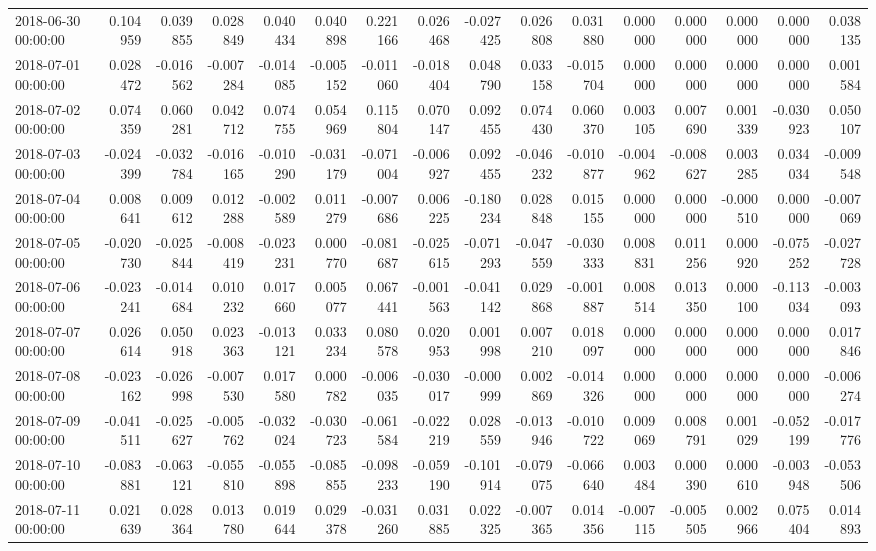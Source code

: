 \begin{tabular}{lrrrrrrrrrrrrrrr}
2018-06-30 00:00:00 & 0.104959 & 0.039855 & 0.028849 & 0.040434 & 0.040898 & 0.221166 & 0.026468 & -0.027425 & 0.026808 & 0.031880 & 0.000000 & 0.000000 & 0.000000 & 0.000000 & 0.038135 \\
2018-07-01 00:00:00 & 0.028472 & -0.016562 & -0.007284 & -0.014085 & -0.005152 & -0.011060 & -0.018404 & 0.048790 & 0.033158 & -0.015704 & 0.000000 & 0.000000 & 0.000000 & 0.000000 & 0.001584 \\
2018-07-02 00:00:00 & 0.074359 & 0.060281 & 0.042712 & 0.074755 & 0.054969 & 0.115804 & 0.070147 & 0.092455 & 0.074430 & 0.060370 & 0.003105 & 0.007690 & 0.001339 & -0.030923 & 0.050107 \\
2018-07-03 00:00:00 & -0.024399 & -0.032784 & -0.016165 & -0.010290 & -0.031179 & -0.071004 & -0.006927 & 0.092455 & -0.046232 & -0.010877 & -0.004962 & -0.008627 & 0.003285 & 0.034034 & -0.009548 \\
2018-07-04 00:00:00 & 0.008641 & 0.009612 & 0.012288 & -0.002589 & 0.011279 & -0.007686 & 0.006225 & -0.180234 & 0.028848 & 0.015155 & 0.000000 & 0.000000 & -0.000510 & 0.000000 & -0.007069 \\
2018-07-05 00:00:00 & -0.020730 & -0.025844 & -0.008419 & -0.023231 & 0.000770 & -0.081687 & -0.025615 & -0.071293 & -0.047559 & -0.030333 & 0.008831 & 0.011256 & 0.000920 & -0.075252 & -0.027728 \\
2018-07-06 00:00:00 & -0.023241 & -0.014684 & 0.010232 & 0.017660 & 0.005077 & 0.067441 & -0.001563 & -0.041142 & 0.029868 & -0.001887 & 0.008514 & 0.013350 & 0.000100 & -0.113034 & -0.003093 \\
2018-07-07 00:00:00 & 0.026614 & 0.050918 & 0.023363 & -0.013121 & 0.033234 & 0.080578 & 0.020953 & 0.001998 & 0.007210 & 0.018097 & 0.000000 & 0.000000 & 0.000000 & 0.000000 & 0.017846 \\
2018-07-08 00:00:00 & -0.023162 & -0.026998 & -0.007530 & 0.017580 & 0.000782 & -0.006035 & -0.030017 & -0.000999 & 0.002869 & -0.014326 & 0.000000 & 0.000000 & 0.000000 & 0.000000 & -0.006274 \\
2018-07-09 00:00:00 & -0.041511 & -0.025627 & -0.005762 & -0.032024 & -0.030723 & -0.061584 & -0.022219 & 0.028559 & -0.013946 & -0.010722 & 0.009069 & 0.008791 & 0.001029 & -0.052199 & -0.017776 \\
2018-07-10 00:00:00 & -0.083881 & -0.063121 & -0.055810 & -0.055898 & -0.085855 & -0.098233 & -0.059190 & -0.101914 & -0.079075 & -0.066640 & 0.003484 & 0.000390 & 0.000610 & -0.003948 & -0.053506 \\
2018-07-11 00:00:00 & 0.021639 & 0.028364 & 0.013780 & 0.019644 & 0.029378 & -0.031260 & 0.031885 & 0.022325 & -0.007365 & 0.014356 & -0.007115 & -0.005505 & 0.002966 & 0.075404 & 0.014893 \\

\end{tabular}
